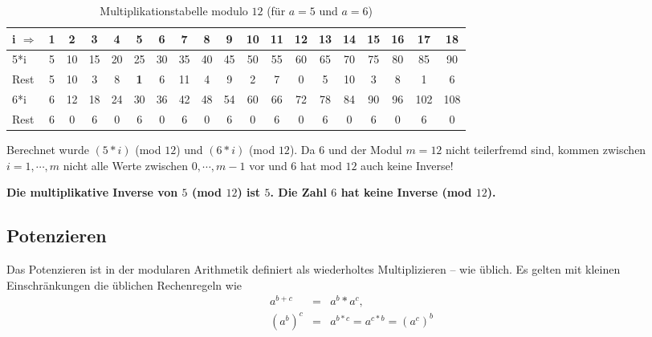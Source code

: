 \begin{refsegment}
\begin{table}[ht]
\begin{center}                                                                  \begin{tabular}{|l@{\:}||c|c|c|c|c|c|c|c|c|c|c||c|c|c|c|c|c|c|}
\hline
i $\Rightarrow$      & 1  & 2  & 3  & 4  & 5  & 6  & 7  & 8  & 9 & 10 & 11 & 12 & 13 & 14 & 15 & 16  & 17  & 18\\
\hline
\hline
5*i                  & 5 & 10 & 15 & 20 & 25 & 30 & 35 & 40 & 45 & 50 & 55 & 60 & 65 & 70 & 75 & 80  & 85  & 90\\
Rest                 & 5 & 10  & 3  & 8  & \textbf{1}  & 6 & 11  & 4  & 9  & 2  & 7  & 0  & 5 & 10  & 3  & 8   & 1   & 6\\
\hline
6*i                  & 6 & 12 & 18 & 24 & 30 & 36 & 42 & 48 & 54 & 60 & 66 & 72 & 78 & 84 & 90 & 96 & 102 & 108\\
Rest                 & 6  & 0  & 6  & 0  & 6  & 0  & 6  & 0  & 6  & 0  & 6  & 0  & 6  & 0  & 6  & 0   & 6   & 0\\
\hline
\end{tabular}
\end{center}
\caption{Multiplikationstabelle modulo $12$ (für $a=5$ und $a=6$)}
\label{mulmod12}
\end{table}

Berechnet wurde $(5 * i)$ (mod $12$) und $(6*i)$ (mod $12$).
Da $6$ und der Modul $m=12$ nicht teilerfremd
sind, kommen zwischen $i=1, \cdots, m$ nicht alle Werte zwischen
$0, \cdots, m-1$ vor und $6$ hat mod $12$ auch keine Inverse!
 

\noindent \textbf{Die multiplikative Inverse von $5$ (mod $12$)
ist $5$. Die Zahl $6$ hat keine Inverse (mod $12$). }



\subsection{Potenzieren}
Das Potenzieren ist in der modularen Arithmetik definiert als wiederholtes
Multiplizieren -- wie üblich.
Es gelten mit kleinen Einschränkungen die üblichen Rechenregeln wie
\begin{eqnarray*}
a^{b+c} & = & a^b * a^c,  \nonumber\\
(a^b)^c & = & a^{b*c} = a^{c*b} = (a^c)^b \nonumber
\end{eqnarray*}



\end{refsegment}
